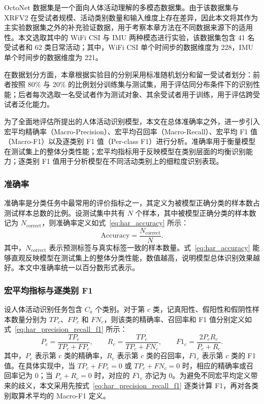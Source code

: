 OctoNet 数据集是一个面向人体活动理解的多模态数据集。由于该数据集与 XRFV2 在受试者规模、活动类别数量和输入维度上存在差异，因此本文将其作为主实验数据集之外的补充验证数据，用于考察本章方法在不同数据来源下的适用性。本文选取其中的 WiFi CSI 与 IMU 两种模态进行实验，该数据集包含 41 名受试者和 62 类日常活动；其中，WiFi CSI 单个时间步的数据维度为 228，IMU 单个时间步的数据维度为 221。

在数据划分方面，本章根据实验目的分别采用标准随机划分和留一受试者划分：前者按照 80\% 与 20\% 的比例划分训练集与测试集，用于评估同分布条件下的识别性能；后者每次选取一名受试者作为测试对象、其余受试者用于训练，用于评估跨受试者泛化能力。


为了全面地评估所提出的人体活动识别模型，本文在总体准确率之外，进一步引入宏平均精确率（Macro-Precision）、宏平均召回率（Macro-Recall）、宏平均 F1 值（Macro-F1）以及逐类别 F1 值（Per-class F1）进行分析。准确率用于衡量模型在测试集上的整体分类性能；宏平均指标用于反映模型在类别层面的均衡识别能力；逐类别 F1 值用于分析模型在不同活动类别上的细粒度识别表现。

\subsubsection{准确率}{}

准确率是分类任务中最常用的评价指标之一，其定义为被模型正确分类的样本数占测试样本总数的比例。设测试集中共有 $N$ 个样本，其中被模型正确分类的样本数记为 $N_{\mathrm{correct}}$，则准确率定义如式~\eqref{eq:har_accuracy} 所示：
\begin{equation}
\mathrm{Accuracy}=\frac{N_{\mathrm{correct}}}{N}.
\label{eq:har_accuracy}
\end{equation}
其中，$N_{\mathrm{correct}}$ 表示预测标签与真实标签一致的样本数量。式~\eqref{eq:har_accuracy} 能够直观反映模型在测试集上的整体分类性能，数值越高，说明模型总体识别效果越好。本文中准确率统一以百分数形式表示。

\subsubsection{宏平均指标与逐类别 F1}{}

设人体活动识别任务包含 $C_a$ 个类别。对于第 $c$ 类，记真阳性、假阳性和假阴性样本数量分别为 $TP_c$、$FP_c$ 和 $FN_c$，则该类的精确率、召回率和 F1 值分别定义如式~\eqref{eq:har_precision_recall_f1} 所示：
\begin{equation}
P_c = \frac{TP_c}{TP_c + FP_c}, \qquad
R_c = \frac{TP_c}{TP_c + FN_c}, \qquad
F1_c = \frac{2P_cR_c}{P_c + R_c}.
\label{eq:har_precision_recall_f1}
\end{equation}
其中，$P_c$ 表示第 $c$ 类的精确率，$R_c$ 表示第 $c$ 类的召回率，$F1_c$ 表示第 $c$ 类的 F1 值。在具体实现中，当 $TP_c+FP_c=0$ 或 $TP_c+FN_c=0$ 时，相应的精确率或召回率记为 0；当 $P_c+R_c=0$ 时，对应的 $F1_c$ 亦记为 0。为避免不同宏平均定义带来的歧义，本文采用先按式~\eqref{eq:har_precision_recall_f1} 逐类计算 F1，再对各类别取算术平均的 Macro-F1 定义。


